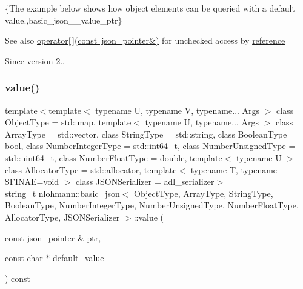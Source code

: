 \{The example below shows how object elements can be queried with a default value.,basic\+\_\+json\+\_\+\+\_\+value\+\_\+ptr\}

\begin{DoxySeeAlso}{See also}
\mbox{\hyperlink{classnlohmann_1_1basic__json_ac6946dffeb3be5aa173645f0467a44b3}{operator\mbox{[}$\,$\mbox{]}(const json\+\_\+pointer\&)}} for unchecked access by \mbox{\hyperlink{classnlohmann_1_1basic__json_ac6a5eddd156c776ac75ff54cfe54a5bc}{reference}}
\end{DoxySeeAlso}
\begin{DoxySince}{Since}
version 2.. 
\end{DoxySince}
\mbox{\label{classnlohmann_1_1basic__json_a869c900ee02cf1a68988dcce3b375424}} 
\subsubsection{\texorpdfstring{value()}{value()}\hspace{0.1cm}{\footnotesize\ttfamily [4/4]}}
{\footnotesize\ttfamily template$<$template$<$ typename U, typename V, typename... Args $>$ class Object\+Type = std\+::map, template$<$ typename U, typename... Args $>$ class Array\+Type = std\+::vector, class String\+Type  = std\+::string, class Boolean\+Type  = bool, class Number\+Integer\+Type  = std\+::int64\+\_\+t, class Number\+Unsigned\+Type  = std\+::uint64\+\_\+t, class Number\+Float\+Type  = double, template$<$ typename U $>$ class Allocator\+Type = std\+::allocator, template$<$ typename T, typename S\+F\+I\+N\+A\+E=void $>$ class J\+S\+O\+N\+Serializer = adl\+\_\+serializer$>$ \\
\mbox{\hyperlink{classnlohmann_1_1basic__json_a61f8566a1a85a424c7266fb531dca005}{string\+\_\+t}} \mbox{\hyperlink{classnlohmann_1_1basic__json}{nlohmann\+::basic\+\_\+json}}$<$ Object\+Type, Array\+Type, String\+Type, Boolean\+Type, Number\+Integer\+Type, Number\+Unsigned\+Type, Number\+Float\+Type, Allocator\+Type, J\+S\+O\+N\+Serializer $>$\+::value (\begin{DoxyParamCaption}\item[{const \mbox{\hyperlink{classnlohmann_1_1json__pointer}{json\+\_\+pointer}} \&}]{ptr,  }\item[{const char $\ast$}]{default\+\_\+value }\end{DoxyParamCaption}) const\hspace{0.3cm}{\ttfamily [inline]}}



